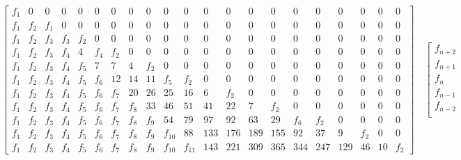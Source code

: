 \begin{sidewaystable}
    \begin{displaymath}
        \left[
            \begin{array}{ccccccccccccccccccccc}
            f_{1} & 0 & 0 & 0 & 0 & 0 & 0 & 0 & 0 & 0 & 0 & 0 & 0 & 0 & 0 & 0 & 0 & 0 & 0 & 0 & 0\\
            f_{1} & f_{2} & f_{1} & 0 & 0 & 0 & 0 & 0 & 0 & 0 & 0 & 0 & 0 & 0 & 0 & 0 & 0 & 0 & 0 & 0 & 0\\
            f_{1} & f_{2} & f_{3} & f_{3} & f_{2} & 0 & 0 & 0 & 0 & 0 & 0 & 0 & 0 & 0 & 0 & 0 & 0 & 0 & 0 & 0 & 0\\
            f_{1} & f_{2} & f_{3} & f_{4} & 4 & f_{4} & f_{2} & 0 & 0 & 0 & 0 & 0 & 0 & 0 & 0 & 0 & 0 & 0 & 0 & 0 & 0\\
            f_{1} & f_{2} & f_{3} & f_{4} & f_{5} & 7 & 7 & 4 & f_{2} & 0 & 0 & 0 & 0 & 0 & 0 & 0 & 0 & 0 & 0 & 0 & 0\\
            f_{1} & f_{2} & f_{3} & f_{4} & f_{5} & f_{6} & 12 & 14 & 11 & f_{5} & f_{2} & 0 & 0 & 0 & 0 & 0 & 0 & 0 & 0 & 0 & 0\\
            f_{1} & f_{2} & f_{3} & f_{4} & f_{5} & f_{6} & f_{7} & 20 & 26 & 25 & 16 & 6 & f_{2} & 0 & 0 & 0 & 0 & 0 & 0 & 0 & 0\\
            f_{1} & f_{2} & f_{3} & f_{4} & f_{5} & f_{6} & f_{7} & f_{8} & 33 & 46 & 51 & 41 & 22 & 7 & f_{2} & 0 & 0 & 0 & 0 & 0 & 0\\
            f_{1} & f_{2} & f_{3} & f_{4} & f_{5} & f_{6} & f_{7} & f_{8} & f_{9} & 54 & 79 & 97 & 92 & 63 & 29 & f_{6} & f_{2} & 0 & 0 & 0 & 0\\
            f_{1} & f_{2} & f_{3} & f_{4} & f_{5} & f_{6} & f_{7} & f_{8} & f_{9} & f_{10} & 88 & 133 & 176 & 189 & 155 & 92 & 37 & 9 & f_{2} & 0 & 0\\
            f_{1} & f_{2} & f_{3} & f_{4} & f_{5} & f_{6} & f_{7} & f_{8} & f_{9} & f_{10} & f_{11} & 143 & 221 & 309 & 365 & 344 & 247 & 129 & 46 & 10 & f_{2}
            \end{array}
            \right]  \quad %
            \left[
                \begin{array}{c}
                    f_{n + 2}\\
                    f_{n + 1}\\
                    f_{n}\\
                    f_{n - 1}\\
                    f_{n - 2}\\

\end{array}
\end{displaymath}
\end{sidewaystable}
